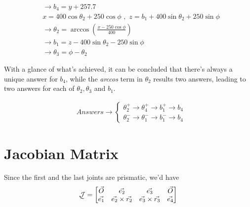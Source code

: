 \documentclass[conference]{IEEEtran}
\begin{document}
\begin{align}
     & \rightarrow b_4         = y + 257.7                                                                                       \\
     & x           = 400 \cos \theta_2 + 250 \cos \phi \,\, , \,\, z         = b_1 + 400 \sin \theta_2 + 250 \sin \phi \nonumber \\
     & \rightarrow \theta_2 = \arccos \left(\frac{x - 250 \cos \phi}{400}\right)                                                 \\
     & \rightarrow b_1 = z - 400 \sin \theta_2 - 250 \sin \phi                                                                   \\
     & \rightarrow \theta_3    = \phi - \theta_2
\end{align}

With a glance of what's achieved, it can be concluded that there's always a unique answer for $b_4$, while the \textit{arccos} term in $\theta_2$ results two answers, leading to two answers for each of $\theta_2, \theta_3$ and $b_1$.
\begin{large}
    \begin{align*}
         & Answers \longrightarrow
        \begin{cases}
            \theta_2 ^+ \longrightarrow\theta_4 ^+ \longrightarrow b_1^+ \longrightarrow b_4 \\[20pt]
            \theta_2 ^- \longrightarrow\theta_1 ^- \longrightarrow b_1^- \longrightarrow b_4
        \end{cases}
    \end{align*}
\end{large}
\vspace{10px}

\section{Jacobian Matrix}
Since the first and the last joints are prismatic, we'd have
\begin{align}
    \undertilde{\mathcal{J}} = \begin{bmatrix}
                                   \vec{O}   & \vec{e_2}                  & \vec{e_3}                  & \vec{O}   \\
                                   \vec{e_1} & \vec{e_2} \times \vec{r_2} & \vec{e_3} \times \vec{r_3} & \vec{e_4} \\
                               \end{bmatrix}
\end{align}
\end{document}

